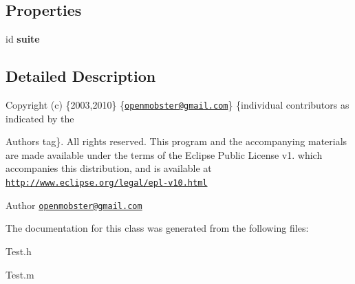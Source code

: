 \subsection*{\-Properties}
\begin{DoxyCompactItemize}
\item 
\hypertarget{interface_test_a8431ebf7801aff3534684c3feaa672ba}{
id {\bfseries suite}}
\label{interface_test_a8431ebf7801aff3534684c3feaa672ba}

\end{DoxyCompactItemize}


\subsection{\-Detailed \-Description}
\-Copyright (c) \{2003,2010\} \{\href{mailto:openmobster@gmail.com}{\tt openmobster@gmail.\-com}\} \{individual contributors as indicated by the \begin{DoxyAuthor}{\-Authors}
tag\}. \-All rights reserved. \-This program and the accompanying materials are made available under the terms of the \-Eclipse \-Public \-License v1. which accompanies this distribution, and is available at \href{http://www.eclipse.org/legal/epl-v10.html}{\tt http\-://www.\-eclipse.\-org/legal/epl-\/v10.\-html}
\end{DoxyAuthor}
\begin{DoxyAuthor}{\-Author}
\href{mailto:openmobster@gmail.com}{\tt openmobster@gmail.\-com} 
\end{DoxyAuthor}


\-The documentation for this class was generated from the following files\-:\begin{DoxyCompactItemize}
\item 
\-Test.\-h\item 
\-Test.\-m\end{DoxyCompactItemize}
